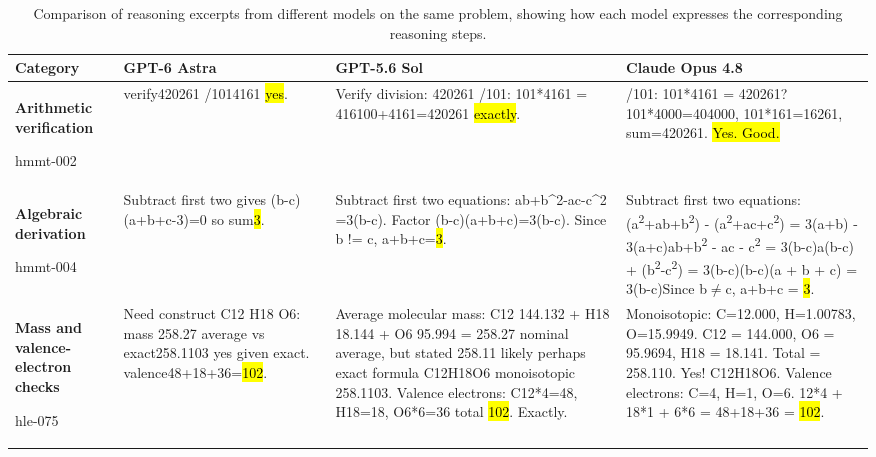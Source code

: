 \begin{table}[!htbp]
\centering
\caption{Comparison of reasoning excerpts from different models on the same problem, showing how each model expresses the corresponding reasoning steps.}
\label{tab:local-telegraphic-examples}
\begingroup
\footnotesize
\setlength{\tabcolsep}{4pt}
\renewcommand{\arraystretch}{1.08}
\begin{tabular}{@{}>{\raggedright\arraybackslash}p{}*{3}{>{\raggedright\arraybackslash}p{}}@{}}
\toprule
Category & GPT-6 Astra & GPT-5.6 Sol & Claude Opus 4.8 \\
\midrule
\textbf{Arithmetic verification}\par hmmt-002 &
verify420261 /1014161 \hl{yes}. &
Verify division: 420261 /101: 101*4161 = 416100+4161=420261 \hl{exactly}. &
420261/101: 101*4161 = 420261? 101*4000=404000, 101*161=16261, sum=420261. \hl{Yes. Good.} \\
\midrule
\textbf{Algebraic derivation}\par hmmt-004 &
Subtract first two gives (b-c)(a+b+c-3)=0 so sum\hl{3}. &
Subtract first two equations: ab+b\mbox{\textasciicircum{}}2-ac-c\mbox{\textasciicircum{}}2 =3(b-c). Factor (b-c)(a+b+c)=3(b-c). Since b != c, a+b+c=\hl{3}. &
Subtract first two equations:\newline (a\mbox{\textsuperscript{2}}+ab+b\mbox{\textsuperscript{2}}) - (a\mbox{\textsuperscript{2}}+ac+c\mbox{\textsuperscript{2}}) = 3(a+b) - 3(a+c)\newline ab+b\mbox{\textsuperscript{2}} - ac - c\mbox{\textsuperscript{2}} = 3(b-c)\newline a(b-c) + (b\mbox{\textsuperscript{2}}-c\mbox{\textsuperscript{2}}) = 3(b-c)\newline (b-c)(a + b + c) = 3(b-c)\newline Since b\mbox{$\ne$}c, a+b+c = \hl{3}. \\
\midrule
\textbf{Mass and valence-electron checks}\par hle-075 &
Need construct C12 H18 O6: mass 258.27 average vs exact258.1103 yes given exact. valence48+18+36=\hl{102}. &
Average molecular mass: C12 144.132 + H18 18.144 + O6 95.994 = 258.27 nominal average, but stated 258.11 likely perhaps exact formula C12H18O6 monoisotopic 258.1103. Valence electrons: C12*4=48, H18=18, O6*6=36 total \hl{102}. Exactly. &
Monoisotopic: C=12.000, H=1.00783, O=15.9949.
C12 = 144.000, O6 = 95.9694, H18 = 18.141. Total = 258.110. Yes! C12H18O6.
Valence electrons: C=4, H=1, O=6. 12*4 + 18*1 + 6*6 = 48+18+36 = \hl{102}. \\
\bottomrule
\end{tabular}
\endgroup
\end{table}
